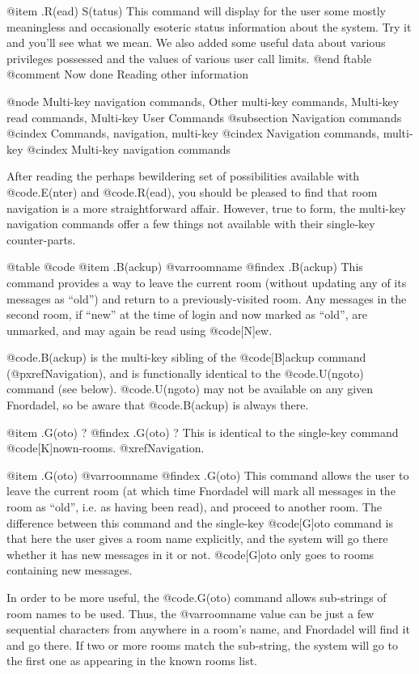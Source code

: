 @item .R(ead) S(tatus)
This command will display for the user some mostly meaningless
and occasionally esoteric status information about the system.  Try it
and you'll see what we mean.  We also added some useful data
about various privileges possessed and the values of various user call
limits.
@end ftable
@comment Now done Reading other information

@node Multi-key navigation commands, Other multi-key commands, Multi-key read commands, Multi-key User Commands
@subsection Navigation commands
@cindex Commands, navigation, multi-key
@cindex Navigation commands, multi-key
@cindex Multi-key navigation commands

After reading the perhaps bewildering set of possibilities available with
@code{.E(nter)} and @code{.R(ead)}, you should be pleased to find that room
navigation is a more straightforward affair.  However, true to form, the
multi-key navigation commands offer a few things not available with their
single-key counter-parts.

@table @code
@item .B(ackup) @var{roomname}
@findex .B(ackup)
This command provides a way to leave the current room (without
updating any of its messages as ``old'') and return to a previously-visited
room.  Any messages in the second room, if ``new'' at the time of login and
now marked as ``old'', are unmarked, and may again be read using @code{[N]ew}.

@code{.B(ackup)} is the multi-key sibling of the @code{[B]ackup} command
(@pxref{Navigation}), and is functionally identical to the @code{.U(ngoto)}
command (see below).  @code{.U(ngoto)} may not be available on any given
Fnordadel, so be aware that @code{.B(ackup)} is always there.

@item .G(oto) ?
@findex .G(oto) ?
This is identical to the single-key command @code{[K]nown-rooms}.
@xref{Navigation}.

@item .G(oto) @var{roomname}
@findex .G(oto)
This command allows the user to leave the current room (at
which time Fnordadel will mark all messages in the room as ``old'', i.e. as having
been read), and proceed to another room.  The difference between this
command and the single-key @code{[G]oto} command is that here the user gives
a room name explicitly, and the system will go there whether it has
new messages in it or not.  @code{[G]oto} only goes to rooms containing new
messages.

In order to be more useful, the @code{.G(oto)} command allows sub-strings
of room names to be used.  Thus, the @var{roomname} value can be
just a few sequential characters from anywhere in a room's name, and
Fnordadel will find it and go there.  If two or more rooms match
the sub-string, the system will go to the first one as appearing in the
known rooms list.

